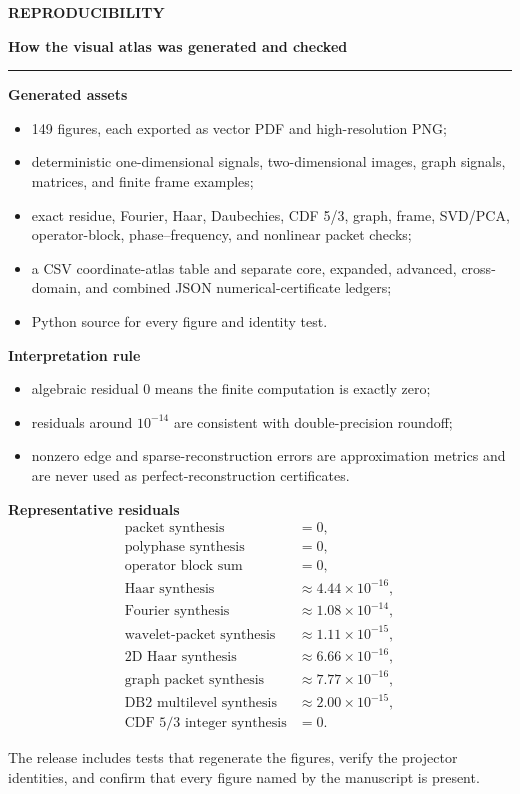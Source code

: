 \documentclass[10pt]{article}
\newcommand{\PageTitle}[2][]{%
  {\color{Muted}\fontsize{9.5}{11}\selectfont\bfseries #1}\par
  \vspace{0.02in}
  {\color{Ink}\fontsize{20}{23}\selectfont\bfseries #2}\par
  \vspace{0.07in}
  {\color{Blue}\rule{\linewidth}{1.15pt}}\par
  \vspace{0.08in}
}
\newcommand{\Callout}[2][PaleBlue]{%
  \noindent\colorbox{#1}{\parbox{0.965\linewidth}{\vspace{2pt}\small\RaggedRight #2\par\vspace{2pt}}}
}
\begin{document}
\clearpage
\PageTitle[REPRODUCIBILITY]{How the visual atlas was generated and checked}
\begin{minipage}[t]{0.56\linewidth}
\textbf{Generated assets}
\begin{itemize}
\item 149 figures, each exported as vector PDF and high-resolution PNG;
\item deterministic one-dimensional signals, two-dimensional images, graph signals, matrices, and finite frame examples;
\item exact residue, Fourier, Haar, Daubechies, CDF 5/3, graph, frame, SVD/PCA, operator-block, phase--frequency, and nonlinear packet checks;
\item a CSV coordinate-atlas table and separate core, expanded, advanced, cross-domain, and combined JSON numerical-certificate ledgers;
\item Python source for every figure and identity test.
\end{itemize}
\textbf{Interpretation rule}
\begin{itemize}
\item algebraic residual $0$ means the finite computation is exactly zero;
\item residuals around $10^{-14}$ are consistent with double-precision roundoff;
\item nonzero edge and sparse-reconstruction errors are approximation metrics and are never used as perfect-reconstruction certificates.
\end{itemize}
\end{minipage}\hfill
\begin{minipage}[t]{0.40\linewidth}
\colorbox{PaleTeal}{\parbox{0.92\linewidth}{
\vspace{8pt}
\textbf{Representative residuals}
\begin{align*}
\text{packet synthesis} &=0,\\
\text{polyphase synthesis} &=0,\\
\text{operator block sum} &=0,\\
\text{Haar synthesis} &\approx4.44\times10^{-16},\\
\text{Fourier synthesis} &\approx1.08\times10^{-14},\\
\text{wavelet-packet synthesis} &\approx1.11\times10^{-15},\\
\text{2D Haar synthesis} &\approx6.66\times10^{-16},\\
\text{graph packet synthesis} &\approx7.77\times10^{-16},\\
\text{DB2 multilevel synthesis} &\approx2.00\times10^{-15},\\
\text{CDF 5/3 integer synthesis} &=0.
\end{align*}
\vspace{4pt}}}
\end{minipage}
\vfill
\Callout[PaleMagenta]{The release includes tests that regenerate the figures, verify the projector identities, and confirm that every figure named by the manuscript is present.}
\end{document}
